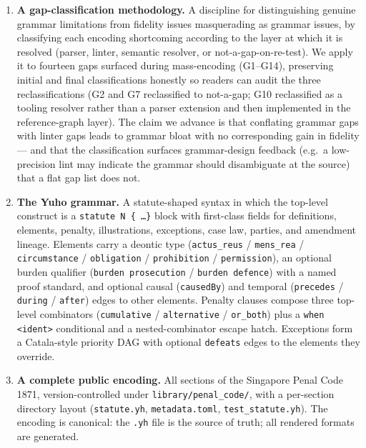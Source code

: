 \begin{enumerate}
\item \textbf{A gap-classification methodology.} A discipline for
distinguishing genuine grammar limitations from fidelity issues
masquerading as grammar issues, by classifying each encoding
shortcoming according to the layer at which it is resolved (parser,
linter, semantic resolver, or not-a-gap-on-re-test). We apply it to
fourteen gaps surfaced during mass-encoding (\textsf{G1}--\textsf{G14}),
preserving initial and final classifications honestly so readers can
audit the three reclassifications (\textsf{G2} and \textsf{G7}
reclassified to not-a-gap; \textsf{G10} reclassified as a tooling
resolver rather than a parser extension and then implemented in the
reference-graph layer). The claim we advance is that conflating grammar gaps with
linter gaps leads to grammar bloat with no corresponding gain in
fidelity --- and that the classification surfaces grammar-design
feedback (e.g.\ a low-precision lint may indicate the grammar should
disambiguate at the source) that a flat gap list does not.

\item \textbf{The Yuho grammar.} A statute-shaped syntax in which the
top-level construct is a \texttt{statute N \{ \dots \}} block with first-class
fields for definitions, elements, penalty, illustrations, exceptions, case
law, parties, and amendment lineage. Elements carry a deontic type
(\texttt{actus\_reus} / \texttt{mens\_rea} / \texttt{circumstance} /
\texttt{obligation} / \texttt{prohibition} / \texttt{permission}), an optional
burden qualifier (\texttt{burden prosecution} / \texttt{burden defence})
with a named proof standard, and optional causal (\texttt{causedBy}) and
temporal (\texttt{precedes} / \texttt{during} / \texttt{after}) edges to
other elements. Penalty clauses compose three top-level combinators
(\texttt{cumulative} / \texttt{alternative} / \texttt{or\_both}) plus a
\texttt{when <ident>} conditional and a nested-combinator escape hatch.
Exceptions form a Catala-style priority DAG with optional \texttt{defeats}
edges to the elements they override.

\item \textbf{A complete public encoding.} All \statRawSections{} sections
of the Singapore Penal Code 1871, version-controlled under
\texttt{library/penal\_code/}, with a per-section directory layout
(\texttt{statute.yh}, \texttt{metadata.toml}, \texttt{test\_statute.yh}).
The encoding is canonical: the \texttt{.yh} file is the source of truth;
all rendered formats are generated.


\end{enumerate}
